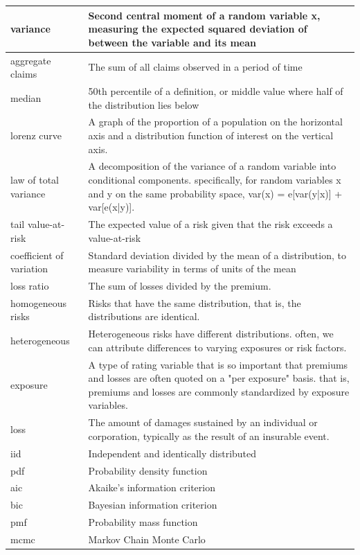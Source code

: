 \documentclass[
]{book}
\begin{document}
\begin{longtable}{>{\raggedright\arraybackslash}p{10em}|>{\raggedright\arraybackslash}p{30em}}
\hline
variance & Second central moment of a random variable x, measuring the expected squared deviation of between the variable and its mean\\
\hline
aggregate claims & The sum of all claims observed in a period of time\\
\hline
median & 50th percentile of a definition, or middle value where half of the distribution lies below\\
\hline
lorenz curve & A graph of the proportion of a population on the horizontal axis and a distribution function of interest on the vertical axis.\\
\hline
law of total variance & A decomposition of the variance of a random variable into conditional components. specifically, for random variables x and y on the same probability space, var(x) = e[var(y|x)] + var[e(x|y)].\\
\hline
tail value-at-risk & The expected value of a risk given that the risk exceeds a value-at-risk\\
\hline
coefficient of variation & Standard deviation divided by the mean of a distribution, to measure variability in terms of units of the mean\\
\hline
loss ratio & The sum of losses divided by the premium.\\
\hline
homogeneous risks & Risks that have the same distribution, that is, the distributions are identical.\\
\hline
heterogeneous & Heterogeneous risks have different distributions. often, we can attribute differences to varying exposures or risk factors.\\
\hline
exposure & A type of rating variable that is so important that premiums and losses are often quoted on a "per exposure" basis. that is, premiums and losses are commonly standardized by exposure variables.\\
\hline
loss & The amount of damages sustained by an individual or corporation, typically as the result of an insurable event.\\
\hline
iid & Independent and identically distributed\\
\hline
pdf & Probability density function\\
\hline
aic & Akaike's information criterion\\
\hline
bic & Bayesian information criterion\\
\hline
pmf & Probability mass function\\
\hline
mcmc & Markov Chain Monte Carlo\\

\end{longtable}
\end{document}
